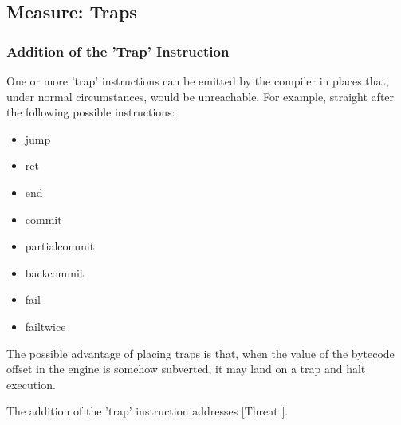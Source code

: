\subsection{Measure: Traps}

\subsubsection{Addition of the 'Trap' Instruction}

One or more 'trap' instructions can be emitted by the compiler in places that,
under normal circumstances, would be unreachable. For example, straight
after the following possible instructions:

\begin{itemize}
\item{jump}
\item{ret}
\item{end}
\item{commit}
\item{partialcommit}
\item{backcommit}
\item{fail}
\item{failtwice}
\end{itemize}

The possible advantage of placing traps is that, when the value of the
bytecode offset in the engine is somehow subverted, it may land on a trap
and halt execution.

The addition of the 'trap' instruction addresses [Threat \thethreatbcupset].

